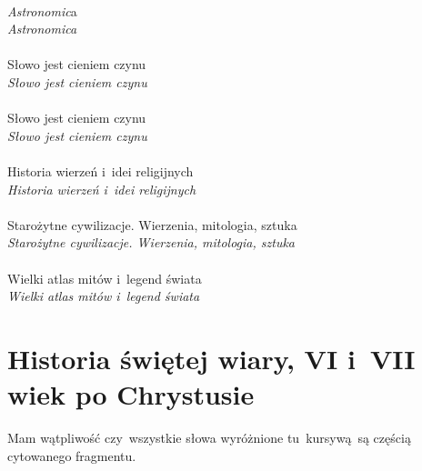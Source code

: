 \documentclass[a4paper,11pt]{article}
\begin{document}
 \\
\Jest  \textit{Astronomic}a \\
\Powin \textit{Astronomica} \\
 \\
\Jest  Słowo jest cieniem czynu \\
\Powin \textit{Słowo jest cieniem czynu} \\
 \\
\Jest  Słowo jest cieniem czynu \\
\Powin \textit{Słowo jest cieniem czynu} \\
 \\
\Jest  Historia wierzeń i~idei religijnych \\
\Powin \textit{Historia wierzeń i~idei religijnych} \\
 \\
\Jest  Starożytne cywilizacje. Wierzenia, mitologia, sztuka \\
\Powin \textit{Starożytne cywilizacje. Wierzenia, mitologia, sztuka} \\
 \\
\Jest  Wielki atlas mitów i~legend świata \\
\Powin \textit{Wielki atlas mitów i~legend świata} \\


\vspace{\spaceTwo}










\section{Historia świętej wiary, VI i~VII wiek po Chrystusie}

\vspace{\spaceTwo}







\start {} Mam wątpliwość czy~wszystkie słowa wyróżnione
tu~kursywą~są częścią cytowanego fragmentu.
\end{document}

